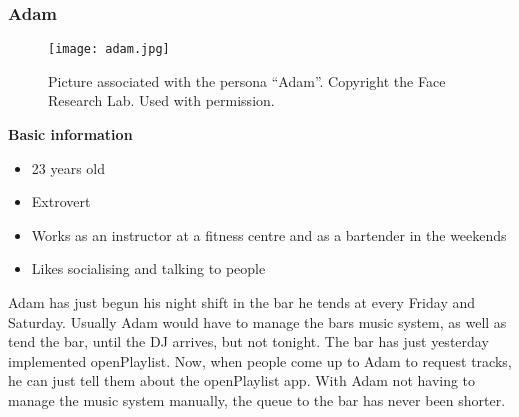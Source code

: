 \subsubsection{Adam}
\begin{figure} [h]
  \centering
  \texttt{[image: adam.jpg]}
  \caption{Picture associated with the persona \enquote{Adam}. Copyright the Face Research Lab. Used with permission.}\label{fig:adam}
\end{figure}
\noindent\textbf{Basic information}

\begin{itemize}
\item 23 years old
\item Extrovert
\item Works as an instructor at a fitness centre and as a bartender in the weekends
\item Likes socialising and talking to people
\end{itemize}

Adam has just begun his night shift in the bar he tends at every Friday and Saturday. Usually Adam would have to manage the bars music system, as well as tend the bar, until the DJ arrives, but not tonight. The bar has just yesterday implemented openPlaylist. Now, when people come up to Adam to request tracks, he can just tell them about the openPlaylist app. With Adam not having to manage the music system manually, the queue to the bar has never been shorter.
